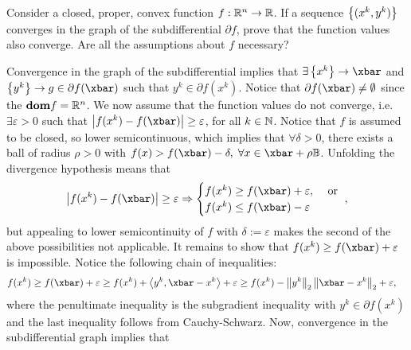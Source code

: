 \documentclass[10pt]{article}
\newcommand{\eps}{\varepsilon}
\begin{document}
\allowdisplaybreaks
\everymath{\displaystyle}
\newenvironment{longlisting}{\captionsetup{type=listing}}{}


\begin{Exercise}
	Consider a closed, proper, convex function $f: \mathbb{R}^n \to \mathbb{R}$. If a
	sequence $\left\{ (x^k, y^k) \right\}$ converges in the graph of the subdifferential
	$\partial f$, prove that the function values also converge. Are all the
	assumptions about $f$ necessary?
\end{Exercise}
\begin{Answer}
	Convergence in the graph of the subdifferential implies that $\exists
	\set{x^k} \to \xbar$ and $\set{y^k} \to g \in \partial f(\xbar)$ such that
	$y^k \in \partial f(x^k)$. Notice that $\partial f(\xbar) \neq \emptyset$
	since the $\textbf{dom} f = \mathbb{R}^n$. We now assume that the function values do not
	converge, i.e. $\exists \eps > 0$ such that $\abs{f(x^k) - f(\xbar)} \geq
	\eps$, for all $k \in \mathbb{N}$. Notice that $f$ is assumed to be closed, so
	lower semicontinuous, which implies that $\forall \delta > 0$, there exists
	a ball of radius $\rho > 0$ with $f(x) > f(\xbar) - \delta, \; \forall x \in
	\xbar + \rho \mathbb{B}$. Unfolding the divergence hypothesis means that
	\[
		\abs{f(x^k) - f(\xbar)} \geq \eps \Rightarrow
		\begin{cases}
			f(x^k) \geq f(\xbar) + \eps, & \text{ or } \\
			f(x^k) \leq f(\xbar) - \eps
		\end{cases},
	\]
	but appealing to lower semicontinuity of $f$ with $\delta := \eps$ makes
	the second of the above possibilities not applicable. It remains to show
	that $f(x^k) \geq f(\xbar) + \eps$ is impossible. Notice the following
	chain of inequalities:
	\begin{align*}
		f(x^k) &\geq f(\xbar) + \eps \geq f(x^k) + \ip{y^k, \xbar - x^k} + \eps
			    \geq f(x^k) - \norm{y^k}_2 \norm{\xbar - x^k}_2 + \eps,
	\end{align*}
	where the penultimate inequality is the subgradient inequality with $y^k \in
	\partial f(x^k)$ and the last inequality follows from Cauchy-Schwarz. Now,
	convergence in the subdifferential graph implies that
\end{Answer}
\end{document}
